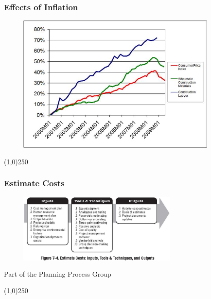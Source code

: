 \begin{frame}
\frametitle{Effects of Inflation}
 \begin{figure}
 	\centering
 		\includegraphics[width = 10cm]{images/deflation.jpg}
 	\label{fig:deflation}
 \end{figure}
\end{frame}
\begin{center}\line(1,0){250}\end{center}






\begin{frame}
\frametitle{Estimate Costs}
\begin{figure}
	\centering
		\includegraphics[width = 8cm]{images/fig7-4.jpg}
	\label{fig:7-4}
\end{figure}Part of the Planning Process Group
\end{frame}
\begin{center}\line(1,0){250}\end{center}






